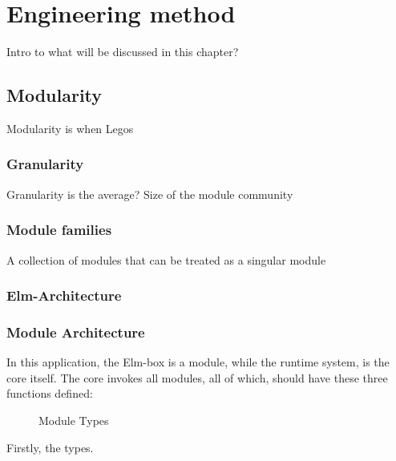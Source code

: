 \chapter{Engineering method}


Intro to what will be discussed in this chapter?

\section{Modularity}

Modularity is when Legos

\subsection{Granularity}

Granularity is the average? Size of the module community

\subsection{Module families}

A collection of modules that can be treated as a singular module

\subsection{Elm-Architecture}


\subsection{Module Architecture}

In this application, the Elm-box is a module, while the runtime system, is the
core itself. The core invokes all modules, all of which, should have these three
functions defined:


\begin{figure}
  \centering
  
  \caption{Module Types}
\end{figure}

Firstly, the types.

